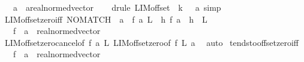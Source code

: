 \begin{isabellebody}
\ \ \ a\ {\isacharcolon}{\kern0pt}{\isacharcolon}{\kern0pt}\ {\isachardoublequoteopen}{\isacharprime}{\kern0pt}a{\isacharcolon}{\kern0pt}{\isacharcolon}{\kern0pt}real{\isacharunderscore}{\kern0pt}normed{\isacharunderscore}{\kern0pt}vector{\isachardoublequoteclose}\isanewline
%
\isadelimproof
\ \ %
\endisadelimproof
%
\isatagproof
{}\isamarkupfalse%
\ {\isacharparenleft}{\kern0pt}drule\ LIM{\isacharunderscore}{\kern0pt}offset\ {\isacharbrackleft}{\kern0pt}\ k\ {\isacharequal}{\kern0pt}\ {\isachardoublequoteopen}{\isacharminus}{\kern0pt}\ a{\isachardoublequoteclose}{\isacharbrackright}{\kern0pt}{\isacharparenright}{\kern0pt}\ simp%
\endisatagproof
{\isafoldproof}%
%
\isadelimproof
\isanewline
%
\endisadelimproof
\isanewline
{}\isamarkupfalse%
\ LIM{\isacharunderscore}{\kern0pt}offset{\isacharunderscore}{\kern0pt}zero{\isacharunderscore}{\kern0pt}iff{\isacharcolon}{\kern0pt}\ {\isachardoublequoteopen}NO{\isacharunderscore}{\kern0pt}MATCH\ {}\ a\ {\isasymLongrightarrow}\ f\ {\isasymmidarrow}a{\isasymrightarrow}\ L\ {\isasymlongleftrightarrow}\ {\isacharparenleft}{\kern0pt}{\isasymlambda}h{\isachardot}{\kern0pt}\ f\ {\isacharparenleft}{\kern0pt}a\ {\isacharplus}{\kern0pt}\ h{\isacharparenright}{\kern0pt}{\isacharparenright}{\kern0pt}\ {\isasymmidarrow}{}{\isasymrightarrow}\ L{\isachardoublequoteclose}\isanewline
\ \ \ f\ {\isacharcolon}{\kern0pt}{\isacharcolon}{\kern0pt}\ {\isachardoublequoteopen}{\isacharprime}{\kern0pt}a\ {\isacharcolon}{\kern0pt}{\isacharcolon}{\kern0pt}\ real{\isacharunderscore}{\kern0pt}normed{\isacharunderscore}{\kern0pt}vector\ {\isasymRightarrow}\ {\isacharunderscore}{\kern0pt}{\isachardoublequoteclose}\isanewline
%
\isadelimproof
\ \ %
\endisadelimproof
%
\isatagproof
{}\isamarkupfalse%
\ LIM{\isacharunderscore}{\kern0pt}offset{\isacharunderscore}{\kern0pt}zero{\isacharunderscore}{\kern0pt}cancel{\isacharbrackleft}{\kern0pt}of\ f\ a\ L{\isacharbrackright}{\kern0pt}\ LIM{\isacharunderscore}{\kern0pt}offset{\isacharunderscore}{\kern0pt}zero{\isacharbrackleft}{\kern0pt}of\ f\ L\ a{\isacharbrackright}{\kern0pt}\ \isamarkupfalse%
\ auto%
\endisatagproof
{\isafoldproof}%
%
\isadelimproof
\isanewline
%
\endisadelimproof
\isanewline
{}\isamarkupfalse%
\ tendsto{\isacharunderscore}{\kern0pt}offset{\isacharunderscore}{\kern0pt}zero{\isacharunderscore}{\kern0pt}iff{\isacharcolon}{\kern0pt}\isanewline
\ \ \ f\ {\isacharcolon}{\kern0pt}{\isacharcolon}{\kern0pt}\ {\isachardoublequoteopen}{\isacharprime}{\kern0pt}a\ {\isacharcolon}{\kern0pt}{\isacharcolon}{\kern0pt}\ real{\isacharunderscore}{\kern0pt}normed{\isacharunderscore}{\kern0pt}vector\ {\isasymRightarrow}\ {\isacharunderscore}{\kern0pt}{\isachardoublequoteclose}\isanewline

\end{isabellebody}

